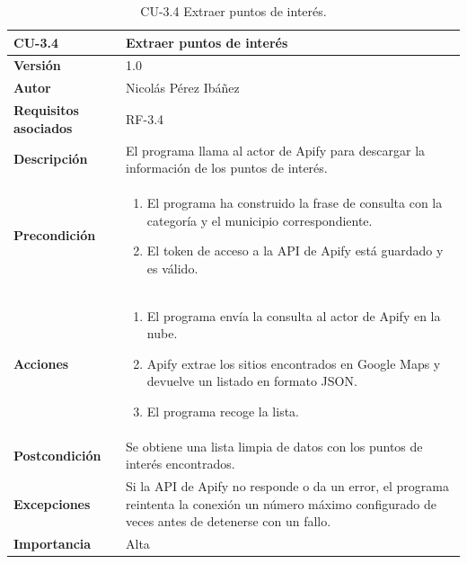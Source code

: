 \begin{table}[p]
	\centering
	\begin{tabularx}{\linewidth}{ p{} p{} }
		\toprule
		\textbf{CU-3.4}  & \textbf{Extraer puntos de interés}\\
		\toprule
		\textbf{Versión}              & 1.0    \\
		\textbf{Autor}                & Nicolás Pérez Ibáñez \\
		\textbf{Requisitos asociados} & RF-3.4 \\
		\textbf{Descripción}          & El programa llama al actor de Apify para descargar la información de los puntos de interés. \\
		\textbf{Precondición}         & 
        \begin{enumerate}
			\def\labelenumi{\arabic{enumi}.}
			\tightlist
			\item El programa ha construido la frase de consulta con la categoría y el municipio correspondiente.
            \item El token de acceso a la API de Apify está guardado y es válido.
        \end{enumerate}\\
		\textbf{Acciones}             &
		\begin{enumerate}
			\def\labelenumi{\arabic{enumi}.}
			\tightlist
			\item El programa envía la consulta al actor de Apify en la nube.
			\item Apify extrae los sitios encontrados en Google Maps y devuelve un listado en formato JSON.
			\item El programa recoge la lista.
		\end{enumerate}\\
		\textbf{Postcondición}        & Se obtiene una lista limpia de datos con los puntos de interés encontrados. \\
		\textbf{Excepciones}          & Si la API de Apify no responde o da un error, el programa reintenta la conexión un número máximo configurado de veces antes de detenerse con un fallo. \\
		\textbf{Importancia}          & Alta \\
		\bottomrule
	\end{tabularx}
	\caption{CU-3.4 Extraer puntos de interés.}
\end{table}

